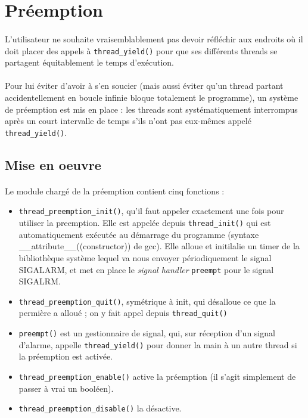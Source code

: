 
\section{Préemption}

\paragraph{}
L'utilisateur ne souhaite vraisemblablement pas devoir réfléchir aux endroits où il doit placer des appels à \texttt{thread\_yield()} pour que ses différents threads se partagent équitablement le temps d'exécution.

\paragraph{}
Pour lui éviter d'avoir à s'en soucier (mais aussi éviter qu'un thread partant accidentellement en boucle infinie bloque totalement le programme), un système de préemption est mis en place : les threads sont systématiquement interrompus après un court intervalle de temps s'ils n'ont pas eux-mêmes appelé \texttt{thread\_yield()}.

\subsection{Mise en oeuvre}

\paragraph{}
Le module chargé de la préemption contient cinq fonctions :

\begin{itemize}
\item \texttt{thread\_preemption\_init()}, qu'il faut appeler exactement une fois pour utiliser la preemption. Elle est appelée depuis \texttt{thread\_init()} qui est automatiquement exécutée au démarrage du programme (syntaxe \_\_attribute\_\_((constructor)) de gcc).
Elle alloue et initilalie un timer de la bibliothèque système lequel va nous envoyer périodiquement le signal SIGALARM, et met en place le \textit{signal handler} \texttt{preempt} pour le signal SIGALRM.
\item \texttt{thread\_preemption\_quit()}, symétrique à init, qui désalloue ce que la permière a alloué ; on y fait appel depuis \texttt{thread\_quit()}
\item \texttt{preempt()} est un gestionnaire de signal, qui, sur réception d'un signal d'alarme, appelle \texttt{thread\_yield()} pour donner la main à un autre thread si la préemption est activée.
\item \texttt{thread\_preemption\_enable()} active la préemption (il s'agit simplement de passer à vrai un booléen).
\item \texttt{thread\_preemption\_disable()} la désactive.
\end{itemize}

